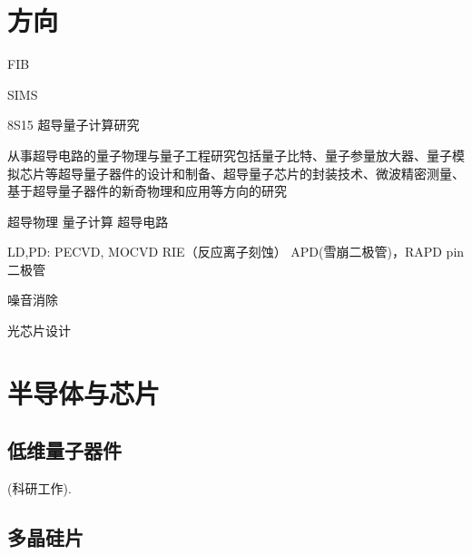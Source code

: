  
\usepackage[a4paper,left=15mm,right=15mm,top=15mm,bottom=15mm]{geometry} %


	
\newpage
	
	\renewcommand{\contentsname}{目录}  %
	\tableofcontents\label{目录}

\section{方向}
FIB

SIMS




8S15 超导量子计算研究

从事超导电路的量子物理与量子工程研究包括量子比特、量子参量放大器、量子模拟芯片等超导量子器件的设计和制备、超导量子芯片的封装技术、微波精密测量、基于超导量子器件的新奇物理和应用等方向的研究

超导物理
量子计算
超导电路

LD,PD:
PECVD, MOCVD
RIE（反应离子刻蚀）
APD(雪崩二极管)，RAPD
pin二极管

噪音消除

光芯片设计

\section{半导体与芯片}

\subsection{低维量子器件}
(科研工作). 

\subsection{多晶硅片}


